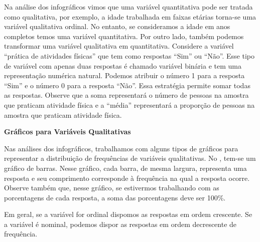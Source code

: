  \begin{observation}{}
Na análise dos infográficos vimos que uma variável quantitativa pode ser tratada como qualitativa, por exemplo, a idade trabalhada em faixas etárias torna-se uma variável qualitativa ordinal. No entanto, se consideramos a idade em anos completos temos uma variável quantitativa. Por outro lado, também podemos transformar uma variável qualitativa em quantitativa. Considere a variável ``prática de atividades físicas'' que tem como respostas ``Sim'' ou ``Não''. Esse tipo de variável com apenas duas respostas é chamado  variável binária e tem uma representação numérica natural. Podemos atribuir o número 1 para a resposta ``Sim'' e o número 0 para a resposta ``Não''. Essa estratégia permite somar todas as respostas. Observe que a soma representará o número de pessoas na amostra que praticam atividade física e a ``média'' representará a proporção de pessoas na amostra que praticam atividade física.
 \end{observation}

\textbf{Gráficos para Variáveis Qualitativas}

Nas análises dos infográficos, trabalhamos com alguns tipos de gráficos para representar a distribuição de frequências de variáveis qualitativas. No {\hyperref[\detokenize{PE103-0:fig-infografico-pnad-3}]{}}, tem-se um  gráfico de barras. Nesse gráfico, cada barra, de mesma largura, representa uma resposta e seu comprimento corresponde à  frequência na qual a resposta ocorre. Observe também que, nesse gráfico, se estivermos trabalhando com as porcentagens de cada resposta, a soma das porcentagens deve ser 100\%.

Em geral, se a variável for ordinal dispomos as respostas em ordem crescente. Se a variável é nominal, podemos dispor as respostas em ordem decrescente de frequência.

